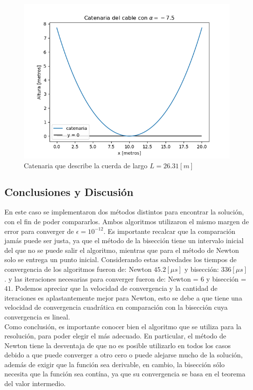 \documentclass[a4paper, 11pt, spanish]{article}
\begin{document}
\begin{figure}[h]
\centering
\includegraphics[scale=0.5]{catenaria.png}
\caption{Catenaria que describe la cuerda de largo $L = 26.31 [m]$ } 
\label{catenaria1}
\end{figure} 


\subsection{Conclusiones y Discusi\'on}
En este caso se implementaron dos métodos distintos para encontrar la solución, con el fin de poder compararlos. Ambos algoritmos utilizaron el mismo margen de error para converger de $\epsilon = 10^{-12}$. Es importante recalcar que la comparación jamás puede ser justa, ya que el método de la bisección tiene un intervalo inicial del que no se puede salir el algoritmo, mientras que para el método de Newton solo se entrega un punto inicial. Considerando estas salvedades los tiempos de convergencia de los algoritmos fueron de: Newton $45.2 [\mu s]$ y bisección: $336 [\mu s]$ . y las iteraciones necesarias para converger fueron de: Newton = $6$ y bisección = $41$. Podemos apreciar que la velocidad de convergencia y la cantidad de iteraciones es aplastantemente mejor para Newton, esto se debe a que tiene una velocidad de convergencia cuadrática en comparación con la bisección cuya convergencia es lineal.\\
Como conclusión, es importante conocer bien el algoritmo que se utiliza para la resolución, para poder elegir el más adecuado. En particular, el método de Newton tiene la desventaja de que no es posible utilizarlo en todos los casos debido a que puede converger a otro cero o puede alejarse mucho de la solución, además de exigir que la función sea derivable, en cambio, la bisección sólo necesita que la función sea contína, ya que su convergencia se basa en el teorema del valor intermedio.
\end{document}
